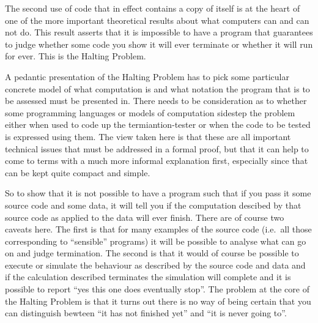 The second use of code that in effect contains a copy of itself is at the
heart of one of the more important theoretical results about what computers
can and can not do. This result asserts that it is impossible to have a
program that guarantees to judge whether some code you show it will
ever terminate or whether it will run for ever. This is the Halting Problem.

A pedantic presentation of the Halting Problem has to pick some particular
concrete model of what computation is and what notation the program that is
to be assessed must be presented in. There needs to be consideration as to
whether some programming languages or models of computation sidestep the
problem either when used to code up the termiantion-tester or when the
code to be tested is expressed using them. The view taken here is that these
are all important technical issues that must be addressed in a formal proof,
but that it can help to come to terms with a much more informal explanation
first, especially since that can be kept quite compact and simple.

So to show that it is not possible to have a program such that if you
pass it some source code and some data, it will tell you if the
computation descibed by that source code as applied to the data will
ever finish. There are of course two caveats here. The first is that
for many examples of the source code (i.e.\ all those corresponding to
``sensible'' programs) it will be possible to analyse what can go on and
judge termination. The second is that it would of course be possible to
execute or simulate the behaviour as described by the source code and data
and if the calculation described terminates the simulation will complete
and it is possible to report ``yes this one does eventually stop''. The
problem at the core of the Halting Problem is that it turns out there is
no way of being certain that you can distinguish bewteen ``it has not
finished yet'' and ``it is never going to''.

